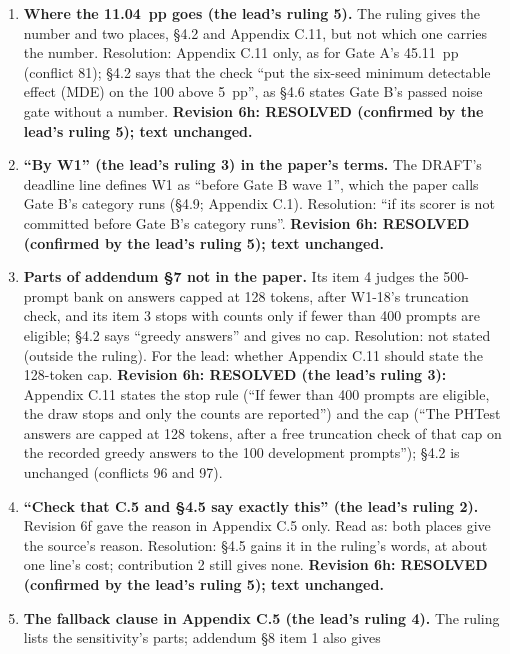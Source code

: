 \documentclass{article}
\theoremstyle{plain}
\theoremstyle{definition}
\theoremstyle{remark}
\begin{document}
\begin{enumerate}
  \item \textbf{Where the 11.04~pp goes (the lead's ruling 5).} The ruling gives
        the number and two places, \S{}4.2 and Appendix C.11, but not which one
        carries the number. Resolution: Appendix C.11 only, as for Gate A's
        45.11~pp (conflict 81); \S{}4.2 says that the check ``put the six-seed
        minimum detectable effect (MDE) on the 100 above 5~pp'', as \S{}4.6
        states Gate B's passed noise gate without a number. \textbf{Revision 6h:
        RESOLVED (confirmed by the lead's ruling 5); text unchanged.}
  \item \textbf{``By W1'' (the lead's ruling 3) in the paper's terms.} The
        DRAFT's deadline line defines W1 as ``before Gate B wave 1'', which the
        paper calls Gate B's category runs (\S{}4.9; Appendix C.1). Resolution:
        ``if its scorer is not committed before Gate B's category runs''.
        \textbf{Revision 6h: RESOLVED (confirmed by the lead's ruling 5); text
        unchanged.}
  \item \textbf{Parts of addendum \S{}7 not in the paper.} Its item 4 judges the
        500-prompt bank on answers capped at 128 tokens, after W1-18's
        truncation check, and its item 3 stops with counts only if fewer than
        400 prompts are eligible; \S{}4.2 says ``greedy answers'' and gives no
        cap. Resolution: not stated (outside the ruling). For the lead: whether
        Appendix C.11 should state the 128-token cap. \textbf{Revision 6h:
        RESOLVED (the lead's ruling 3):} Appendix C.11 states the stop rule
        (``If fewer than 400 prompts are eligible, the draw stops and only the
        counts are reported'') and the cap (``The PHTest answers are capped at
        128 tokens, after a free truncation check of that cap on the recorded
        greedy answers to the 100 development prompts''); \S{}4.2 is unchanged
        (conflicts 96 and 97).
  \item \textbf{``Check that C.5 and \S{}4.5 say exactly this'' (the lead's
        ruling 2).} Revision 6f gave the reason in Appendix C.5 only. Read as:
        both places give the source's reason. Resolution: \S{}4.5 gains it in
        the ruling's words, at about one line's cost; contribution 2 still gives
        none. \textbf{Revision 6h: RESOLVED (confirmed by the lead's ruling 5);
        text unchanged.}
  \item \textbf{The fallback clause in Appendix C.5 (the lead's ruling 4).} The
        ruling lists the sensitivity's parts; addendum \S{}8 item 1 also gives

\end{enumerate}
\end{document}
